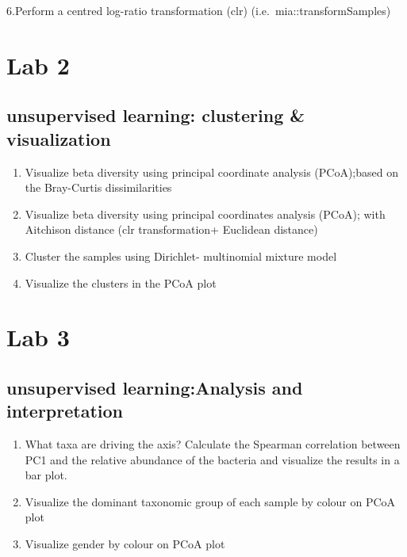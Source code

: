 \documentclass[
  oneside]{book}
\begin{document}
6.Perform a centred log-ratio transformation (clr) (i.e.~mia::transformSamples)

\hypertarget{lab-2}{%
\chapter{Lab 2}\label{lab-2}}

\hypertarget{unsupervised-learning-clustering-visualization}{%
\section{unsupervised learning: clustering \& visualization}\label{unsupervised-learning-clustering-visualization}}

\begin{enumerate}
\def\labelenumi{\arabic{enumi}.}
\item
  Visualize beta diversity using principal coordinate analysis (PCoA);based on the Bray-Curtis dissimilarities
\item
  Visualize beta diversity using principal coordinates analysis (PCoA); with Aitchison distance (clr transformation+ Euclidean distance)
\item
  Cluster the samples using Dirichlet- multinomial mixture model
\item
  Visualize the clusters in the PCoA plot
\end{enumerate}

\hypertarget{lab-3}{%
\chapter{Lab 3}\label{lab-3}}

\hypertarget{unsupervised-learninganalysis-and-interpretation}{%
\section{unsupervised learning:Analysis and interpretation}\label{unsupervised-learninganalysis-and-interpretation}}

\begin{enumerate}
\def\labelenumi{\arabic{enumi}.}
\item
  What taxa are driving the axis? Calculate the Spearman correlation between PC1 and the relative abundance of the bacteria and visualize the results in a bar plot.
\item
  Visualize the dominant taxonomic group of each sample by colour on PCoA plot
\item
  Visualize gender by colour on PCoA plot
\end{enumerate}

  
\end{document}
